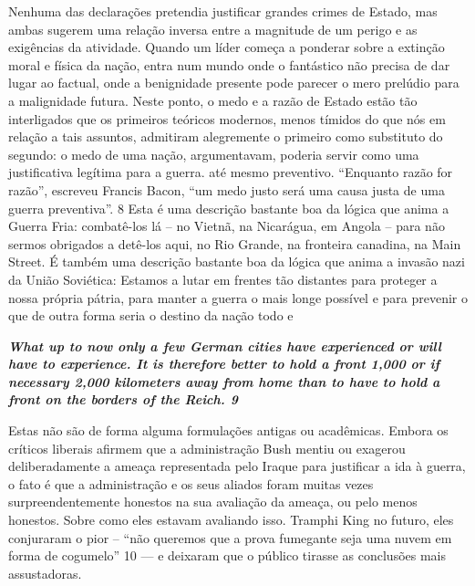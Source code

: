 Nenhuma das declarações pretendia justificar grandes crimes de Estado, mas ambas sugerem uma relação inversa entre a magnitude de um perigo e as exigências da atividade. Quando um líder começa a ponderar sobre a extinção moral e física da nação, entra num mundo onde o fantástico não precisa de dar lugar ao factual, onde a benignidade presente pode parecer o mero prelúdio para a malignidade futura. Neste ponto, o medo e a razão de Estado estão tão interligados que os primeiros teóricos modernos, menos tímidos do que nós em relação a tais assuntos, admitiram alegremente o primeiro como substituto do segundo: o medo de uma nação, argumentavam, poderia servir como uma justificativa legítima para a guerra.  até mesmo preventivo. “Enquanto razão for razão”, escreveu Francis Bacon, “um medo justo será uma causa justa de uma guerra preventiva”.
 {\color{blue} 8}  
Esta é uma descrição bastante boa da lógica que anima a Guerra Fria: combatê-los lá – no Vietnã, na Nicarágua, em Angola – para não sermos obrigados a detê-los aqui, no Rio Grande, na fronteira canadina, na Main Street. É também uma descrição bastante boa da lógica que anima a invasão nazi da União Soviética: Estamos a lutar em frentes tão distantes para proteger a nossa própria pátria, para manter a guerra o mais longe possível e para prevenir o que de outra forma seria o destino da nação todo e
 
\par
 

 \textbf{\textit{What up to now only a few German cities have experienced or will have to experience. It is therefore better to hold a front 1,000 or if necessary 2,000 kilometers away from home than to have to hold a front on the borders of the Reich. {{\color{blue} 9} } } }  
 
 
\par
 
Estas não são de forma alguma formulações antigas ou acadêmicas. Embora os críticos liberais afirmem que a administração Bush mentiu ou exagerou deliberadamente a ameaça representada pelo Iraque para justificar a ida à guerra, o fato é que a administração e os seus aliados foram muitas vezes surpreendentemente honestos na sua avaliação da ameaça, ou pelo menos honestos. Sobre como eles estavam avaliando isso. Tramphi King no futuro, eles conjuraram o pior – “não queremos que a prova fumegante seja uma nuvem em forma de cogumelo”
 {\color{blue} 10}  
— e deixaram que o público tirasse as conclusões mais assustadoras.
 
\par
 
